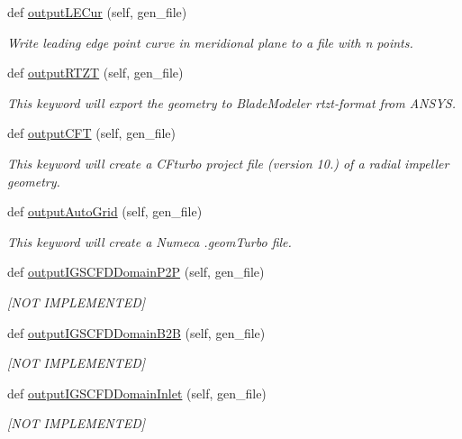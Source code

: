 \begin{DoxyCompactItemize}
def \hyperlink{a00070_a55ddee4c839782858d6f53a49b9c63ec}{output\+L\+E\+Cur} (self, gen\+\_\+file)
\begin{DoxyCompactList}\small\item\em Write leading edge point curve in meridional plane to a file with n points. \end{DoxyCompactList}\item 
def \hyperlink{a00070_a27407b1e60e56fceec34147b9b793a74}{output\+R\+T\+ZT} (self, gen\+\_\+file)
\begin{DoxyCompactList}\small\item\em This keyword will export the geometry to Blade\+Modeler rtzt-\/format from A\+N\+S\+YS. \end{DoxyCompactList}\item 
def \hyperlink{a00070_ad727ca92f2959a8d915939c73f3dbff1}{output\+C\+FT} (self, gen\+\_\+file)
\begin{DoxyCompactList}\small\item\em This keyword will create a C\+Fturbo project file (version 10.) of a radial impeller geometry. \end{DoxyCompactList}\item 
def \hyperlink{a00070_a61f9db1d33a2cb583c3f779a94ec700d}{output\+Auto\+Grid} (self, gen\+\_\+file)
\begin{DoxyCompactList}\small\item\em This keyword will create a Numeca .geom\+Turbo file. \end{DoxyCompactList}\item 
def \hyperlink{a00070_aa7a1b9b7db9021015b02a691075d88e3}{output\+I\+G\+S\+C\+F\+D\+Domain\+P2P} (self, gen\+\_\+file)
\begin{DoxyCompactList}\small\item\em \mbox{[}N\+OT I\+M\+P\+L\+E\+M\+E\+N\+T\+ED\mbox{]} \end{DoxyCompactList}\item 
def \hyperlink{a00070_a8e556016279f9aabdabb9b6f708c95cb}{output\+I\+G\+S\+C\+F\+D\+Domain\+B2B} (self, gen\+\_\+file)
\begin{DoxyCompactList}\small\item\em \mbox{[}N\+OT I\+M\+P\+L\+E\+M\+E\+N\+T\+ED\mbox{]} \end{DoxyCompactList}\item 
def \hyperlink{a00070_a1a577ed1880def26fc13d02701e9346a}{output\+I\+G\+S\+C\+F\+D\+Domain\+Inlet} (self, gen\+\_\+file)
\begin{DoxyCompactList}\small\item\em \mbox{[}N\+OT I\+M\+P\+L\+E\+M\+E\+N\+T\+ED\mbox{]} \end{DoxyCompactList}\item 

\end{DoxyCompactItemize}
